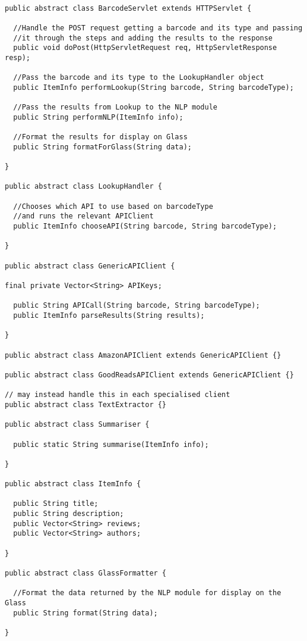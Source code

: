 \documentclass[12pt,a4paper]{report}
\begin{document}
\begin{lstlisting}
	
public abstract class BarcodeServlet extends HTTPServlet {

  //Handle the POST request getting a barcode and its type and passing
  //it through the steps and adding the results to the response
  public void doPost(HttpServletRequest req, HttpServletResponse resp);

  //Pass the barcode and its type to the LookupHandler object
  public ItemInfo performLookup(String barcode, String barcodeType);

  //Pass the results from Lookup to the NLP module
  public String performNLP(ItemInfo info);

  //Format the results for display on Glass
  public String formatForGlass(String data);

}

public abstract class LookupHandler {

  //Chooses which API to use based on barcodeType 
  //and runs the relevant APIClient
  public ItemInfo chooseAPI(String barcode, String barcodeType);
	
}

public abstract class GenericAPIClient {

final private Vector<String> APIKeys;

  public String APICall(String barcode, String barcodeType);
  public ItemInfo parseResults(String results);

}

public abstract class AmazonAPIClient extends GenericAPIClient {}

public abstract class GoodReadsAPIClient extends GenericAPIClient {}

// may instead handle this in each specialised client
public abstract class TextExtractor {}

public abstract class Summariser {

  public static String summarise(ItemInfo info);

}

public abstract class ItemInfo {

  public String title;
  public String description;
  public Vector<String> reviews;
  public Vector<String> authors;

}

public abstract class GlassFormatter {

  //Format the data returned by the NLP module for display on the Glass
  public String format(String data);

}

\end{lstlisting}
\end{document}
